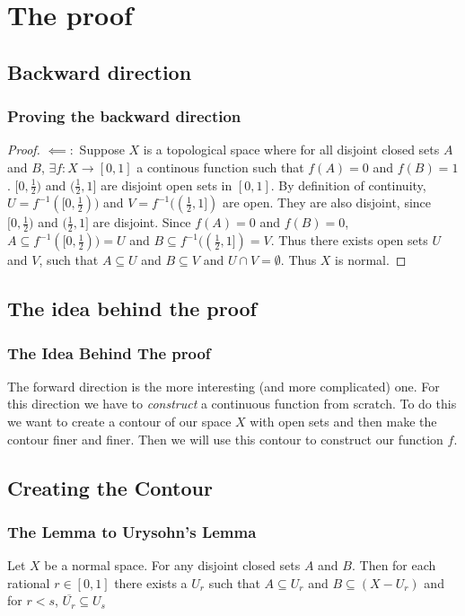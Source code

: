 \documentclass{beamer}
\newcommand*{\subeq}{\subseteq}
\newcommand*{\empset}{\emptyset}
\begin{document}
\section*{The proof}
\subsection*{Backward direction}
\begin{frame}
    \frametitle{Proving the backward direction}

    \begin{proof}
        $\impliedby:$ Suppose $X$ is a topological space where for all disjoint closed sets $A$ and $B$, $\exists f: X \to [0, 1]$ a continous function such that $f(A) = 0$ and $f(B) = 1$. $[0, \frac{1}{2})$ and $(\frac{1}{2}, 1]$ are disjoint open sets in $[0, 1]$. By definition of continuity, $U = f^{-1}([0, \frac{1}{2}))$ and $V = f^{-1}((\frac{1}{2}, 1])$ are open. They are also disjoint, since $[0, \frac{1}{2})$ and $(\frac{1}{2}, 1]$ are disjoint. Since $f(A) = 0$ and $f(B) = 0$, $A \subeq f^{-1}([0, \frac{1}{2})) = U$ and $B \subeq f^{-1}((\frac{1}{2}, 1]) = V$. Thus there exists open sets $U$ and $V$, such that  $A \subeq U$ and $B \subeq V$ and $U \cap V = \empset$. Thus $X$ is normal.            
    \end{proof}

\end{frame}

\subsection{The idea behind the proof}
\begin{frame}
    \frametitle{The Idea Behind The proof}

    The forward direction is the more interesting (and more complicated) one. For this direction we have to \textit{construct} a continuous function from scratch. To do this we want to create a contour of our space $X$ with open sets and then make the contour finer and finer. Then we will use this contour to construct our function $f$. 

\end{frame}


\subsection*{Creating the Contour}
\begin{frame}
    \frametitle{The Lemma to Urysohn's Lemma}

    \begin{theorem}
        Let $X$ be a normal space. For any disjoint closed sets $A$ and $B$. Then for each rational $r \in [0, 1]$ there exists a $U_r$ such that $A \subeq U_r$ and $B \subeq (X - U_r)$ and for $r < s$, $\overline{U_r} \subeq U_s$          
    \end{theorem}

\end{frame}
\end{document}
